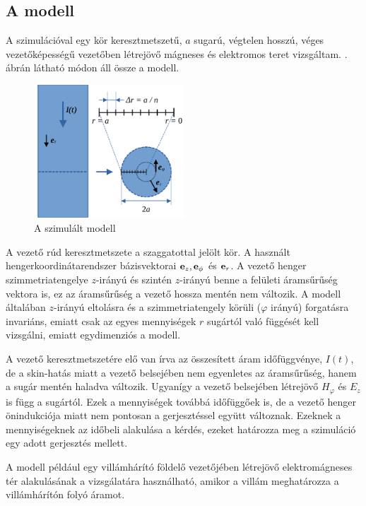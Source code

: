         \subsection{A modell}
            A szimulációval egy kör keresztmetszetű, $a$ sugarú, végtelen hosszú, véges vezetőképességű vezetőben létrejövő mágneses és elektromos teret vizsgáltam. . ábrán látható módon áll össze a modell. 
            \par
            \begin{figure}[h]
                \centering
                \includegraphics[width=0.5\textwidth]{kep/modell.pdf}
                \caption{A szimulált modell}
                \label{fig:modell}
            \end{figure}
             A vezető rúd keresztmetszete a szaggatottal jelölt kör. A használt hengerkoordinátarendszer bázisvektorai ${\bf e}_{z}, {\bf e}_{\phi}$ és ${\bf e}_{r}$. A vezető henger szimmetriatengelye $z$-irányú és szintén $z$-irányú benne a felületi áramsűrűség vektora is, ez az áramsűrűség a vezető hossza mentén nem változik. A modell általában $z$-irányú eltolásra és a szimmetriatengely körüli ($\varphi$ irányú) forgatásra invariáns, emiatt csak az egyes mennyiségek $r$ sugártól való függését kell vizsgálni, emiatt egydimenziós a modell.
             \par
             A vezető keresztmetszetére elő van írva az összesített áram időfüggvénye, $I(t)$, de a skin-hatás miatt a vezető belsejében nem egyenletes az áramsűrűség, hanem a sugár mentén haladva változik. Ugyanígy a vezető belsejében létrejövő $H_\varphi$ és $E_z$ is függ a sugártól. Ezek a mennyiségek továbbá időfüggőek is, de a vezető henger önindukciója miatt nem pontosan a gerjesztéssel együtt változnak. Ezeknek a mennyiségeknek az időbeli alakulása a kérdés, ezeket határozza meg a szimuláció egy adott gerjesztés mellett.
            \par
            A modell például egy villámhárító földelő vezetőjében létrejövő elektromágneses tér alakulásának a vizsgálatára használható, amikor a villám meghatározza a villámhárítón folyó áramot.
